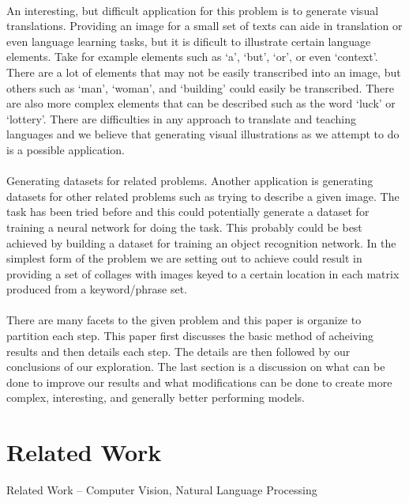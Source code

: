 \documentclass[12pt]{article}
\begin{document}
\paragraph{}
An interesting, but difficult application for this problem is to generate visual translations. 
Providing an image for a small set of texts can aide in translation or even language learning
tasks, but it is dificult to illustrate certain language elements. Take for example elements
such as `a', `but', `or', or even `context'. There are a lot of elements that may not be 
easily transcribed into an image, but others such as `man', `woman', and `building' could
easily be transcribed. There are also more complex elements that can be described such as
the word `luck' or `lottery'. There are difficulties in any approach to translate and 
teaching languages and we believe that generating visual illustrations as we attempt to do 
is a possible application.

\paragraph{}
Generating datasets for related problems.
Another application is generating datasets for other related problems such as trying to 
describe a given image. The task has been tried before and this could potentially generate
a dataset for training a neural network for doing the task. This probably could be best 
achieved by building a dataset for training an object recognition network. In the simplest
form of the problem we are setting out to achieve could result in providing a set of collages
with images keyed to a certain location in each matrix produced from a keyword/phrase set.

\paragraph{}
There are many facets to the given problem and this paper is organize to partition each step. This
paper first discusses the basic method of acheiving results and then details each step. The details
are then followed by our conclusions of our exploration. The last section is a discussion on what 
can be done to improve our results and what modifications can be done to create more complex, 
interesting, and generally better performing models.

\section{Related Work}
Related Work
-- Computer Vision, Natural Language Processing
\end{document}
